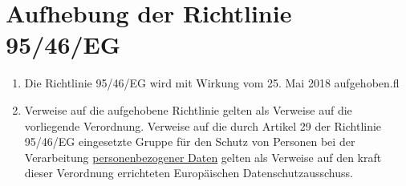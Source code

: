 \chapter{Aufhebung der Richtlinie 95/46/EG}
\label{ch:94}


\begin{enumerate}

  \item Die Richtlinie 95/46/EG wird mit Wirkung vom 25. Mai 2018 aufgehoben.ﬂ
  \label{itm:94-1}

  \item Verweise auf die aufgehobene Richtlinie gelten als Verweise auf die vorliegende Verordnung. Verweise auf die
   durch Artikel 29 der Richtlinie 95/46/EG eingesetzte Gruppe für den Schutz von Personen bei der Verarbeitung
   \hyperref[itm:04-1]{personenbezogener Daten} gelten als Verweise auf den kraft dieser Verordnung errichteten Europäischen
   Datenschutzausschuss.
  \label{itm:94-2}

\end{enumerate}


